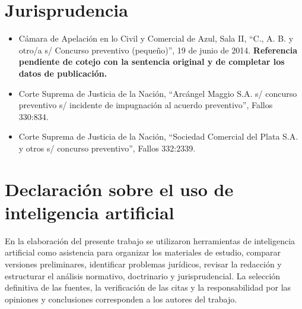\documentclass[12pt,oneside]{book}
\begin{document}
\section*{Jurisprudencia}
\begin{itemize}
    \item Cámara de Apelación en lo Civil y Comercial de Azul, Sala II, ``C., A. B. y otro/a s/ Concurso preventivo (pequeño)'', 19 de junio de 2014. \textbf{Referencia pendiente de cotejo con la sentencia original y de completar los datos de publicación.}
    \item Corte Suprema de Justicia de la Nación, ``Arcángel Maggio S.A. s/ concurso preventivo s/ incidente de impugnación al acuerdo preventivo'', Fallos 330:834.
    \item Corte Suprema de Justicia de la Nación, ``Sociedad Comercial del Plata S.A. y otros s/ concurso preventivo'', Fallos 332:2339.
\end{itemize}

\section*{Declaración sobre el uso de inteligencia artificial}
En la elaboración del presente trabajo se utilizaron herramientas de inteligencia artificial como asistencia para organizar los materiales de estudio, comparar versiones preliminares, identificar problemas jurídicos, revisar la redacción y estructurar el análisis normativo, doctrinario y jurisprudencial. La selección definitiva de las fuentes, la verificación de las citas y la responsabilidad por las opiniones y conclusiones corresponden a los autores del trabajo.
\end{document}
